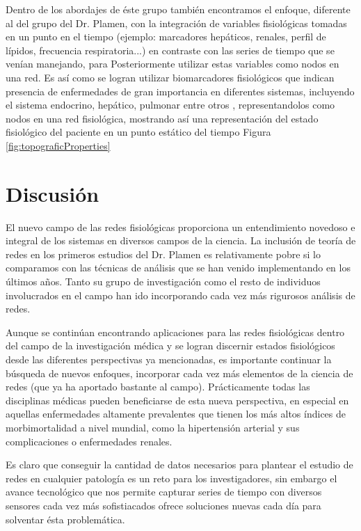 \documentclass[twoside,twocolumn]{article}
\begin{document}
Dentro de los abordajes de éste grupo también encontramos el enfoque, diferente al del grupo del Dr. Plamen, con la integración de variables fisiológicas tomadas en un punto en el tiempo (ejemplo: marcadores hepáticos, renales, perfil de lípidos, frecuencia respiratoria...) en contraste con las series de tiempo que se venían manejando, para Posteriormente utilizar estas variables como nodos en una red.
Es así como se logran utilizar biomarcadores fisiológicos que indican presencia de enfermedades de gran importancia en diferentes sistemas, incluyendo el sistema endocrino, hepático, pulmonar entre otros \cite{barajas2021physiological}, representandolos como nodos en una red fisiológica, mostrando así una representación del estado fisiológico del paciente en un punto estático del tiempo Figura \ref{fig:topograficProperties}

\section{Discusión}
El nuevo campo de las redes fisiológicas proporciona un entendimiento novedoso e integral de los sistemas en diversos campos de la ciencia.
La inclusión de teoría de redes en los primeros estudios del Dr. Plamen es relativamente pobre si lo comparamos con las técnicas de análisis que se han venido implementando en los últimos años.
Tanto su grupo de investigación como el resto de individuos involucrados en el campo han ido incorporando cada vez más rigurosos análisis de redes.

Aunque se continúan encontrando aplicaciones para las redes fisiológicas dentro del campo de la investigación médica y se logran discernir estados fisiológicos desde las diferentes perspectivas ya mencionadas, es importante continuar la búsqueda de nuevos enfoques, incorporar cada vez más elementos de la ciencia de redes (que ya ha aportado bastante al campo). 
Prácticamente todas las disciplinas médicas pueden beneficiarse de esta nueva perspectiva, en especial en aquellas enfermedades altamente prevalentes que tienen los más altos índices de morbimortalidad a nivel mundial, como la hipertensión arterial y sus complicaciones o enfermedades renales.

Es claro que conseguir la cantidad de datos necesarios para plantear el estudio de redes en cualquier patología es un reto para los investigadores, sin embargo el avance tecnológico que nos permite capturar series de tiempo con diversos sensores cada vez más sofistiacados ofrece soluciones nuevas cada día para solventar ésta problemática.
\end{document}
